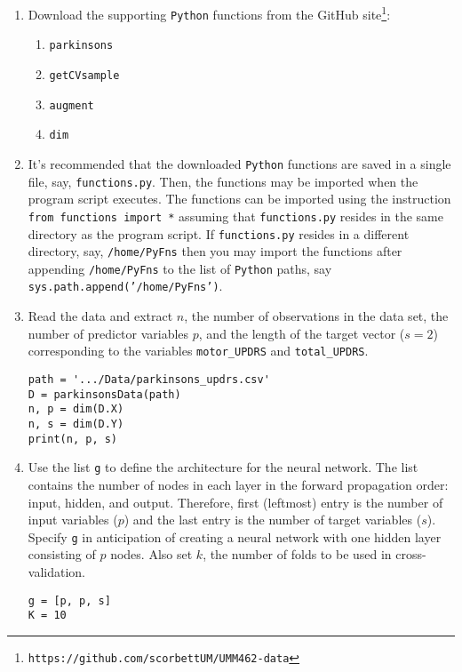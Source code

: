 \documentclass[graybox,envcountchap]{svmono}
\newcommand{\nn}{neural network}
\newcommand{\tx}{\texttt}
\begin{document}
\begin{enumerate}
 \item Download the supporting \tx{Python} functions from the GitHub site\footnote{\small \tx{https://github.com/scorbettUM/UMM462-data} \normalsize}: 
 \begin{enumerate}
  \item \tx{parkinsons}
  \item \tx{getCVsample}
  \item \tx{augment}
  \item \tx{dim}
 \end{enumerate}
 
\item It's recommended that the downloaded \tx{Python} functions are saved in a single file, say, \tx{functions.py}.  Then, the functions may be imported when the program script executes. The functions can be imported using the  instruction \tx{from functions import *} assuming that \tx{functions.py} resides in the same directory as the program script. If \tx{functions.py} resides in a different directory, say, \tx{/home/PyFns} then you may import the functions after appending \tx{/home/PyFns} to the list of \tx{Python} paths, say \tx{sys.path.append('/home/PyFns')}.
\item Read the data and extract $n$, the number of observations in the data set, the number of predictor variables $p$, and the length of the target vector ($s = 2$) corresponding to the variables \verb+motor_UPDRS+ and \verb+total_UPDRS+.
 
\small 
\begin{svgraybox}
\begin{verbatim}
path = '.../Data/parkinsons_updrs.csv'
D = parkinsonsData(path)
n, p = dim(D.X)
n, s = dim(D.Y)
print(n, p, s)
\end{verbatim}
\end{svgraybox}
\normalsize

\item Use the list \tx{g} to define the architecture for the {\nn }.  The list contains the number of nodes in each layer in the forward propagation order: input, hidden, and output. Therefore, first (leftmost) entry is the number of input variables ($p$) and the last entry is the number of target variables ($s$). Specify \tx{g} in anticipation of creating a {\nn } with one hidden layer consisting of $p$ nodes. Also set $k$, the number of folds to be used in cross-validation.  


\small 
\begin{svgraybox}
\begin{verbatim}
g = [p, p, s]
K = 10
\end{verbatim}
\end{svgraybox}
\normalsize


\end{enumerate}
\end{document}

